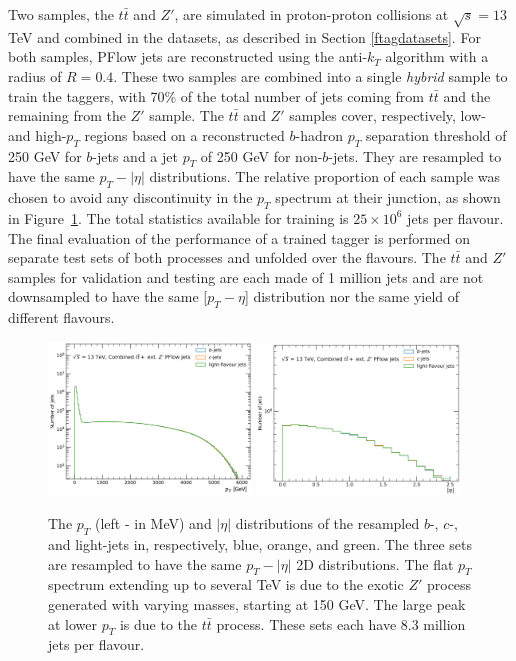 Two samples, the $t\bar{t}$ and $Z'$, are simulated in proton-proton collisions at $\sqrt{s} = 13$ TeV and combined in the datasets, as described in Section \ref{ftagdatasets}. For both samples, PFlow jets are reconstructed using the anti-$k_T$ algorithm with a radius of $R = 0.4$. These two samples are combined into a single \textit{hybrid} sample to train the taggers, with 70\% of the total number of jets coming from $t\bar{t}$ and the remaining from the $Z'$ sample. The $t\bar{t}$ and $Z'$ samples cover, respectively, low- and high-$p_T$ regions based on a reconstructed $b$-hadron $p_T$ separation threshold of 250 GeV for $b$-jets and a jet $p_T$ of 250 GeV for non-$b$-jets. They are resampled to have the same $p_T-|\eta|$ distributions. The relative proportion of each sample was chosen to avoid any discontinuity in the $p_T$ spectrum at their junction, as shown in Figure~\ref{fig:distTraining}. The total statistics available for training is $25 \times 10^{6}$ jets per flavour. The final evaluation of the performance of a trained tagger is performed on separate test sets of both processes and unfolded over the flavours. The $t\bar{t}$ and $Z'$ samples for validation and testing are each made of 1 million jets and are not downsampled to have the same [$p_T - \eta$] distribution nor the same yield of different flavours. \\

\begin{figure}[h!]
  \center
  \includegraphics[width=0.48\textwidth]{Images/FTAG/DL1d/ptdist.png}
  \includegraphics[width=0.48\textwidth]{Images/FTAG/DL1d/etadist.png}
  \caption{The $p_T$ (left - in MeV) and $|\eta|$ distributions of the resampled $b$-, $c$-, and light-jets in, respectively, blue, orange, and green. The three sets are resampled to have the same $p_T-|\eta|$ 2D distributions. The flat $p_T$ spectrum extending up to several TeV is due to the exotic $Z'$ process generated with varying masses, starting at 150 GeV. The large peak at lower $p_T$ is due to the $t\bar{t}$ process. These sets each have 8.3 million jets per flavour.} 
  \label{fig:distTraining}
\end{figure}


